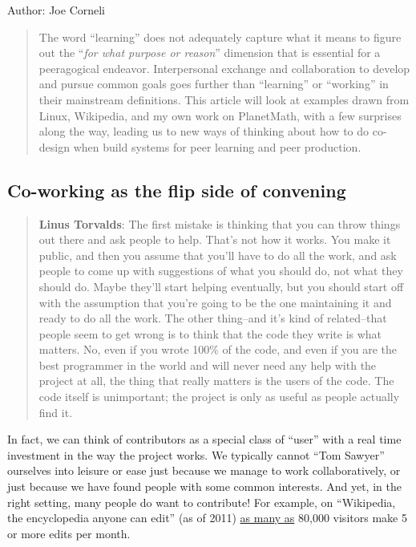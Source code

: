 Author: Joe Corneli

\begin{quote}
The word ``learning'' does not adequately capture what it means to
figure out the ``\emph{for what purpose or reason}'' dimension that is
essential for a peeragogical endeavor. Interpersonal exchange and
collaboration to develop and pursue common goals goes further than
``learning'' or ``working'' in their mainstream definitions. This
article will look at examples drawn from Linux, Wikipedia, and my own
work on PlanetMath, with a few surprises along the way, leading us to
new ways of thinking about how to do co-design when build systems for
peer learning and peer production.
\end{quote}
\subsection{Co-working as the flip side of convening}

\begin{quote}
\textbf{Linus Torvalds}: The first mistake is thinking that you can
throw things out there and ask people to help. That's not how it works.
You make it public, and then you assume that you'll have to do all the
work, and ask people to come up with suggestions of what you should do,
not what they should do. Maybe they'll start helping eventually, but you
should start off with the assumption that you're going to be the one
maintaining it and ready to do all the work. The other thing--and it's
kind of related--that people seem to get wrong is to think that the code
they write is what matters. No, even if you wrote 100\% of the code, and
even if you are the best programmer in the world and will never need any
help with the project at all, the thing that really matters is the users
of the code. The code itself is unimportant; the project is only as
useful as people actually find it.

\end{quote}
In fact, we can think of contributors as a special class of ``user''
with a real time investment in the way the project works. We typically
cannot ``Tom Sawyer'' ourselves into leisure or ease just because we
manage to work collaboratively, or just because we have found people
with some common interests. And yet, in the right setting, many people
do want to contribute! For example, on ``Wikipedia, the encyclopedia
anyone can edit'' (as of 2011)
\href{http://\%20http://www.readwriteweb.com/archives/wikipedias\_goal\_1\_billion\_monthly\_visitors\_by\_2015.php}{as
many as} 80,000 visitors make 5 or more edits per month. 

